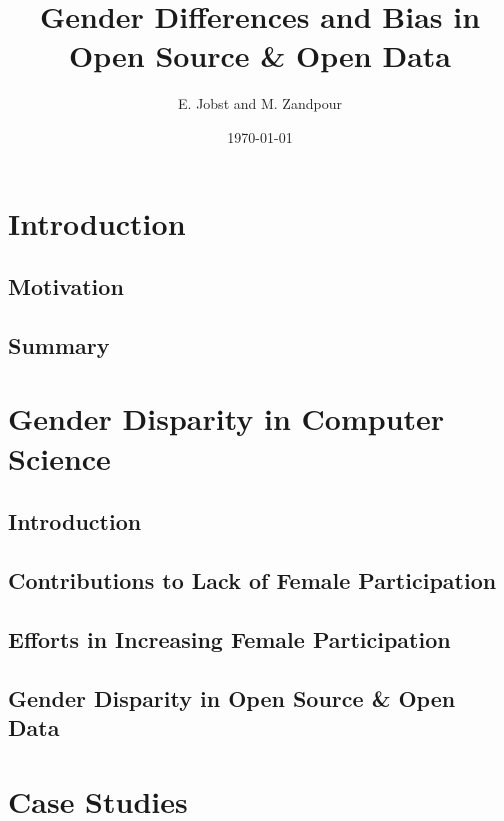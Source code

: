 \documentclass[a4paper, 11pt]{article}
\title{Gender Differences and Bias in Open Source \& Open Data}
\begin{document}
\date{\today}
\author{E. Jobst and M. Zandpour}
\maketitle

\section{Introduction} \label{sec:intro}

\subsection{Motivation} \label{sec:intro:motivation}

\subsection{Summary} \label{sec:intro:summary}

\section{Gender Disparity in Computer Science} \label{sec:gender-disparity}

\subsection{Introduction} \label{sec:gender-disparity:introduction}

\subsection{Contributions to Lack of Female Participation} \label{sec:gender-disparity:contributions}

\subsection{Efforts in Increasing Female Participation} \label{sec:gender-disparity:efforts}

\subsection{Gender Disparity in Open Source \& Open Data}

\section{Case Studies} \label{sec:casestudies}
\end{document}
